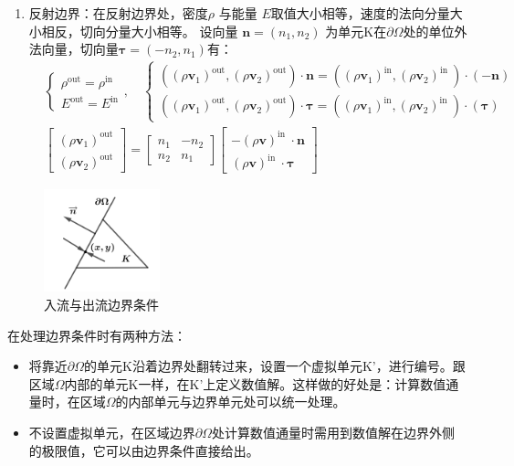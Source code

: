 \documentclass[a4paper, 12pt, UTF8]{ctexart}
\newcommand{\bs}[1]{\boldsymbol{#1}}
\begin{document}
\begin{enumerate}
\item 反射边界：在反射边界处，密度$\rho$ 与能量 $E$取值大小相等，速度的法向分量大小相反，切向分量大小相等。
设向量 $\bs{n}=\left(n_{1}, n_{2}\right)$ 为单元K在$\partial\Omega$处的单位外法向量，切向量$\bs{\tau}=\left(-n_{2}, n_{1}\right)$有：
\begin{equation}
\begin{split}
&\begin{cases}
\rho^{\text{out}}=\rho^{\text {in}} \\
E^{\text {out}}=E^{\text {in}}
\end{cases},\quad
\begin{cases}
\left(\left(\rho \bs v_{1}\right)^{\text {out}},\left(\rho \bs v_{2}\right)^{\text {out}}\right) \cdot \bs{n}=\left(\left(\rho \bs v_{1}\right)^{\text{in}},\left(\rho \bs v_{2}\right)^{\text {in }}\right) \cdot(-\bs{n}) \\
\left(\left(\rho \bs v_{1}\right)^{\text{out}},\left(\rho \bs v_{2}\right)^{\text{out}}\right) \cdot \bs{\tau}=\left(\left(\rho \bs v_{1}\right)^{\text {in}},\left(\rho \bs v_{2}\right)^{\text {in }}\right) \cdot(\bs{\tau})	
\end{cases}\\
&\begin{bmatrix}
\left(\rho \bs v_{1}\right)^{\text {out}} \\
\left(\rho \bs v_{2}\right)^{\text {out}}
\end{bmatrix} = 
\begin{bmatrix}
n_{1} & -n_{2} \\
n_{2} & n_{1}
\end{bmatrix}
\begin{bmatrix}
-({\rho \bs{v}})^{\text{in }} \cdot \bs{n} \\
({\rho \bs{v}})^{\text {in }} \cdot \bs{\tau}
\end{bmatrix}
\end{split}
\end{equation}
\end{enumerate}

\begin{figure}[h] 
	\centering
	\includegraphics[width=0.3\textwidth]{images/7.png}
	\caption{入流与出流边界条件}  
	\label{inflowboundary}
\end{figure}

在处理边界条件时有两种方法：
\begin{itemize}
	\item 将靠近$\partial\Omega$的单元K沿着边界处翻转过来，设置一个虚拟单元K'，进行编号。跟区域$\Omega$内部的单元K一样，在K'上定义数值解。这样做的好处是：计算数值通量时，在区域$\Omega$的内部单元与边界单元处可以统一处理。
	
	\item 不设置虚拟单元，在区域边界$\partial\Omega$处计算数值通量时需用到数值解在边界外侧的极限值，它可以由边界条件直接给出。
\end{itemize}
\end{document}
